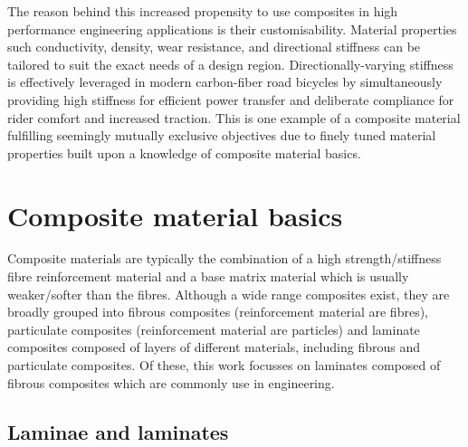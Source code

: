 The reason behind this increased propensity to use composites in high performance engineering applications is their customisability. Material properties such conductivity, density, wear resistance, and directional stiffness can be tailored to suit the exact needs of a design region. Directionally-varying stiffness is effectively leveraged in modern carbon-fiber road bicycles by simultaneously providing high stiffness for efficient power transfer and deliberate compliance for rider comfort and increased traction. This is one example of a composite material fulfilling seemingly mutually exclusive objectives due to finely tuned material properties built upon a knowledge of composite material basics.

\section{Composite material basics}

Composite materials are typically the combination of a high strength/stiffness fibre reinforcement material and a base matrix material which is usually weaker/softer than the fibres. Although a wide range composites exist, they are broadly grouped into fibrous composites (reinforcement material are fibres), particulate composites (reinforcement material are particles) and laminate composites composed of layers of different materials, including fibrous and particulate composites. Of these, this work focusses on laminates composed of fibrous composites which are commonly use in engineering.

\subsection{Laminae and laminates}

